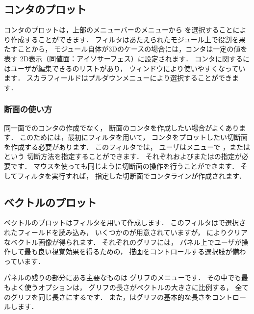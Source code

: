 \subsection{コンタのプロット}
\label{ssec:6.1.6}
コンタのプロットは，上部のメニューバーのメニューから
を選択することにより作成することができます．
フィルタはあたえられたモジュール上で役割を果たすことから，
モジュール自体が3Dのケースの場合には，コンタは一定の値を表す
2D表示（同値面：アイソサーフェス）に設定されます．
コンタに関するにはユーザが編集できるのリストがあり，
ウィンドウにより使いやすくなっています．
スカラフィールドはプルダウンメニューにより選択することができます．

\subsubsection{断面の使い方}
\label{sssec:6.1.6.1}
同一面でのコンタの作成でなく，
断面のコンタを作成したい場合がよくあります．
このためには，最初にフィルタを用いて，
コンタをプロットしたい切断面を作成する必要があります．
このフィルタでは，
ユーザはメニューで
，またはという
切断方法を指定することができます．
%
それぞれおよびまたはの指定が必要です．
マウスを使っても同じように切断面の操作を行うことができます．
そしてフィルタを実行すれば，
指定した切断面でコンタラインが作成されます．

\subsection{ベクトルのプロット}
\label{ssec:6.1.7}
ベクトルのプロットはフィルタを用いて作成します．
このフィルタはで選択されたフィールドを読み込み，
いくつかのが用意されていますが，
によりクリアなベクトル画像が得られます．
それぞれのグリフには，
パネル上でユーザが操作して最も良い視覚効果を得るための，
描画をコントロールする選択肢が備わっています．

パネルの残りの部分にある主要なものは
グリフのメニューです．
その中でも最もよく使うオプションは，
グリフの長さがベクトルの大きさに比例する，
全てのグリフを同じ長さにするです．
また，はグリフの基本的な長さをコントロールします．

